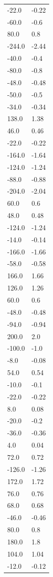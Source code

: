 \begin{longtable}{ll}
-22.0 & -0.22 \\
-60.0 & -0.6 \\
80.0 & 0.8 \\
-244.0 & -2.44 \\
-40.0 & -0.4 \\
-80.0 & -0.8 \\
-48.0 & -0.48 \\
-50.0 & -0.5 \\
-34.0 & -0.34 \\
138.0 & 1.38 \\
46.0 & 0.46 \\
-22.0 & -0.22 \\
-164.0 & -1.64 \\
-124.0 & -1.24 \\
-88.0 & -0.88 \\
-204.0 & -2.04 \\
60.0 & 0.6 \\
48.0 & 0.48 \\
-124.0 & -1.24 \\
-14.0 & -0.14 \\
-166.0 & -1.66 \\
-58.0 & -0.58 \\
166.0 & 1.66 \\
126.0 & 1.26 \\
60.0 & 0.6 \\
-48.0 & -0.48 \\
-94.0 & -0.94 \\
200.0 & 2.0 \\
-100.0 & -1.0 \\
-8.0 & -0.08 \\
54.0 & 0.54 \\
-10.0 & -0.1 \\
-22.0 & -0.22 \\
8.0 & 0.08 \\
-20.0 & -0.2 \\
-36.0 & -0.36 \\
4.0 & 0.04 \\
72.0 & 0.72 \\
-126.0 & -1.26 \\
172.0 & 1.72 \\
76.0 & 0.76 \\
68.0 & 0.68 \\
-46.0 & -0.46 \\
80.0 & 0.8 \\
180.0 & 1.8 \\
104.0 & 1.04 \\
-12.0 & -0.12 \\

\end{longtable}

